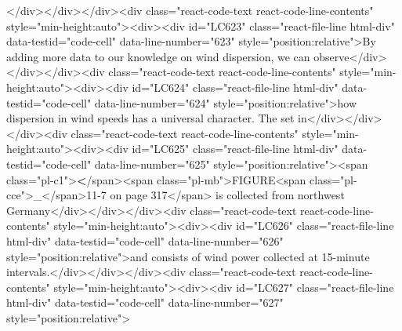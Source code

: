 {{{{</div></div></div><div class="react-code-text react-code-line-contents" style="min-height:auto"><div><div id="LC623" class="react-file-line html-div" data-testid="code-cell" data-line-number="623" style="position:relative">By adding more data to our knowledge on wind dispersion, we can observe</div></div></div><div class="react-code-text react-code-line-contents" style="min-height:auto"><div><div id="LC624" class="react-file-line html-div" data-testid="code-cell" data-line-number="624" style="position:relative">how dispersion in wind speeds has a universal character. The set in</div></div></div><div class="react-code-text react-code-line-contents" style="min-height:auto"><div><div id="LC625" class="react-file-line html-div" data-testid="code-cell" data-line-number="625" style="position:relative"><span class="pl-c1">\textbf</span>{<span class="pl-mb">FIGURE<span class="pl-cce">\_</span>11-7 on page 317</span>} is collected from northwest Germany</div></div></div><div class="react-code-text react-code-line-contents" style="min-height:auto"><div><div id="LC626" class="react-file-line html-div" data-testid="code-cell" data-line-number="626" style="position:relative">and consists of wind power collected at 15-minute intervals.</div></div></div><div class="react-code-text react-code-line-contents" style="min-height:auto"><div><div id="LC627" class="react-file-line html-div" data-testid="code-cell" data-line-number="627" style="position:relative">
}}}}
